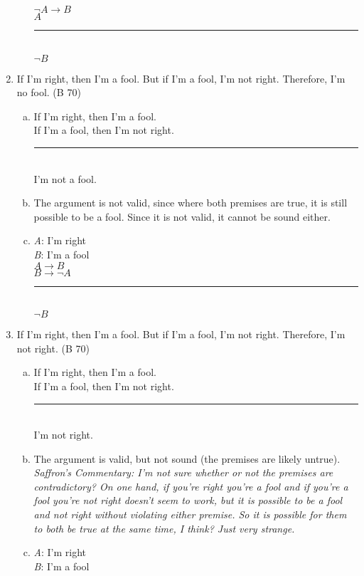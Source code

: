 \documentclass{article}
\begin{document}
\begin{enumerate}
\begin{enumerate}[(a)]
                    $\neg A \to B$\\
                    $A$\\
                    \rule{5em}{.5pt}\\
                    $\neg B$
          \end{enumerate}
    \item If I'm right, then I'm a fool. But if I'm a fool, I'm not right. Therefore, I'm no fool. (B 70)
          \begin{enumerate}[(a)]
              \item If I'm right, then I'm a fool.\\
                    If I'm a fool, then I'm not right.\\
                    \rule{15em}{.5pt}\\
                    I'm not a fool.
              \item The argument is not valid, since where both premises are true, it is still possible to be a fool. Since it is not valid, it cannot be sound either.
              \item \textit{A}: I'm right\\
                    \textit{B}: I'm a fool\\

                    $A \to B$\\
                    $B \to \neg A$\\
                    \rule{5em}{.5pt}\\
                    $\neg B$
          \end{enumerate}
    \item If I'm right, then I'm a fool. But if I'm a fool, I'm not right. Therefore, I'm not right. (B 70)
          \begin{enumerate}[(a)]
              \item If I'm right, then I'm a fool.\\
                    If I'm a fool, then I'm not right.\\
                    \rule{15em}{.5pt}\\
                    I'm not right.
              \item The argument is valid, but not sound (the premises are likely untrue).\\
              \textit{Saffron's Commentary: I'm not sure whether or not the premises are contradictory? On one hand, if you're right you're a fool and if you're a fool you're not right doesn't seem to work, but it is possible to be a fool and not right without violating either premise. So it is possible for them to both be true at the same time, I think? Just very strange.}
              \item \textit{A}: I'm right\\
                    \textit{B}: I'm a fool\\


\end{enumerate}
\end{enumerate}
\end{document}
